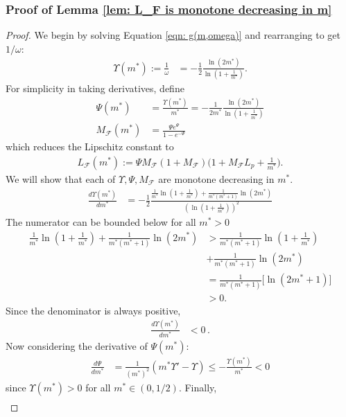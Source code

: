 \documentclass[10pt]{article}
\begin{document}
\subsubsection*{Proof of Lemma \ref{lem: L_F is monotone decreasing in m}}
\begin{proof}
We begin by solving Equation \eqref{eqn: g(m,omega)} and rearranging to get $1/\omega$:
    \begin{align*}
        \Upsilon(m^*) :=\frac{1}{\omega}&= -\frac{1}{2}\frac{\ln(2m^*)}{\ln(1+\frac{1}{m^*})}.
    \end{align*}
For simplicity in taking derivatives, define  
    \begin{align*}
        \Psi(m^*)&= \frac{\Upsilon(m^*)}{m^*} = -\frac{1}{2m^*}\frac{\ln(2m^*)}{\ln(1+\frac{1}{m^*})}\\
        M_\mathcal{F}(m^*) &= \frac{\Psi e^\Psi}{1-e^{-\Psi}}
    \end{align*}
which reduces the Lipschitz constant to
\begin{align*}
    L_\mathcal{F}(m^*) :=\Psi M_\mathcal{F}(1+M_\mathcal{F})\Big(1 + M_\mathcal{F}L_p + \frac{1}{m^*}\Big).
\end{align*}
We will show that each of $\Upsilon, \Psi, M_\mathcal{F}$ are monotone decreasing in $m^*$.
\begin{align}
    \frac{d\Upsilon(m^*)}{dm^*} &= -\frac{1}{2}\frac{\frac{1}{m^*}\ln(1+\frac{1}{m^*}) +\frac{1}{m^*(m^*+1)}\ln(2m^*)}{(\ln(1+\frac{1}{m^*}))^2}
\end{align}
The numerator can be bounded below for all $m^*>0$
\begin{align*}
    \frac{1}{m^*}\ln(1+\frac{1}{m^*}) +\frac{1}{m^*(m^*+1)}\ln(2m^*) &> \frac{1}{m^*(m^*+1)}\ln(1+\frac{1}{m^*})\\ &+\frac{1}{m^*(m^*+1)}\ln(2m^*)\\
    &= \frac{1}{m^*(m^*+1)}\Big[\ln(2m^*+1)\Big]\\
    &>0.
\end{align*}
Since the denominator is always positive,
\begin{align}
    \frac{d\Upsilon(m^*)}{dm^*} &< 0 \,.
\end{align}
Now considering the derivative of $\Psi(m^*)$:
\begin{align*}
    \frac{d\Psi}{dm^*} &= \frac{1}{(m^*)^2}(m^*\Upsilon' -\Upsilon)
    \leq -\frac{\Upsilon(m^*)}{m^*} < 0
\end{align*}
since $\Upsilon(m^*)>0$ for all $m^* \in (0,1/2)$. Finally,
\begin{align*}

\end{align*}
\end{proof}
\end{document}
